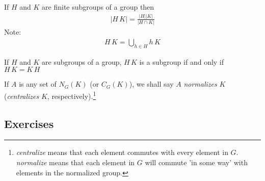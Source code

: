 \documentclass[10pt,a4paper]{report}
\begin{document}
\begin{prop}  If $H$ and $K$ are finite subgroups of a group then 
\begin{align*}
	|H\,K| = \frac{|H||K|}{|H\cap K|}
\end{align*}Note:\begin{align*}
	H\,K = \bigcup_{h\in H} h\, K
\end{align*}
\end{prop}

\begin{prop}  If $H$ and $K$ are subgroups of a group, $H\,K$ is a subgroup if and only if $H\,K = K\, H$
\end{prop}

\begin{definition}If $A$ is any set of $N_G(K)$ (or $C_G(K)$), we shall say $A$ \textit{normalizes} $K$ (\textit{centralizes} $K$, respectively).\footnote{\textit{centralize} means that each element commutes with every element in $G$.  \textit{normalize} means that each element in $G$ will commute 'in some way' with elements in the normalized group.}
\end{definition}

\subsection{Exercises}
\end{document}
